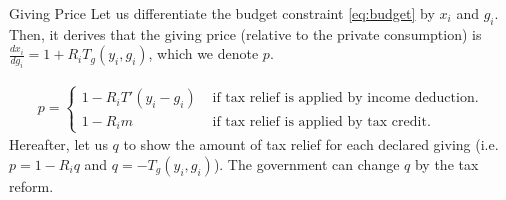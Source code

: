 \documentclass[
  ignorenonframetext,
  aspectratio=169,
]{beamer}
\begin{document}
\begin{frame}{Giving Price}
\protect\hypertarget{giving-price}{}
Let us differentiate the budget constraint \eqref{eq:budget} by \(x_i\) and \(g_i\).
Then, it derives that the giving price (relative to the private consumption) is
\(\frac{dx_i}{dg_i}=1+R_iT_g(y_i,g_i)\), which we denote \(p\).

\begin{align}
    p=
    \begin{cases} 
        1-R_iT'(y_i-g_i)&\text{ if tax relief is applied by income deduction.}\\
        1-R_im&\text{ if tax relief is applied by tax credit.}\label{giving price}
    \end{cases}
\end{align}
Hereafter,
let us \(q\) to show the amount of tax relief for each declared giving
(i.e.~\(p=1-R_iq\) and \(q=-T_g(y_i, g_i)\)).
The government can change \(q\) by the tax reform.
\end{frame}
\end{document}
